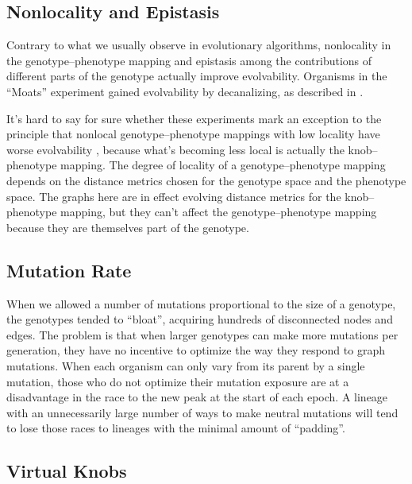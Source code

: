 \documentclass[letterpaper]{article}
\begin{document}

\subsection{Nonlocality and Epistasis}

Contrary to what we usually observe in evolutionary algorithms, nonlocality in
the genotype--phenotype mapping and epistasis among the contributions of
different parts of the genotype actually improve evolvability. Organisms in
the ``Moats'' experiment gained evolvability by decanalizing, as described in
\citet{hansen2006evolution}.

It's hard to say for sure whether these experiments mark an exception to the
principle that nonlocal genotype--phenotype mappings with low locality have
worse evolvability \citep{rothlauf2006locality}, because what's becoming less
local is actually the knob--phenotype mapping. The degree of locality of a
genotype--phenotype mapping depends on the distance metrics chosen for the
genotype space and the phenotype space. The graphs here are in effect evolving
distance metrics for the knob--phenotype mapping, but they can't affect the
genotype--phenotype mapping because they are themselves part of the genotype.

\subsection{Mutation Rate}

When we
allowed a number of mutations proportional to the size of a genotype, the
genotypes tended to ``bloat'', acquiring hundreds of disconnected nodes and
edges. The problem is that when larger genotypes can make more mutations per
generation, they have no incentive to optimize the way they respond to graph
mutations.  When each organism can only vary from its parent by a single
mutation, those who do not optimize their mutation exposure are at a
disadvantage in the race to the new peak at the start of each epoch. A lineage
with an unnecessarily large number of ways to make neutral mutations will tend
to lose those races to lineages with the minimal amount of ``padding''.

\subsection{Virtual Knobs}
\end{document}
